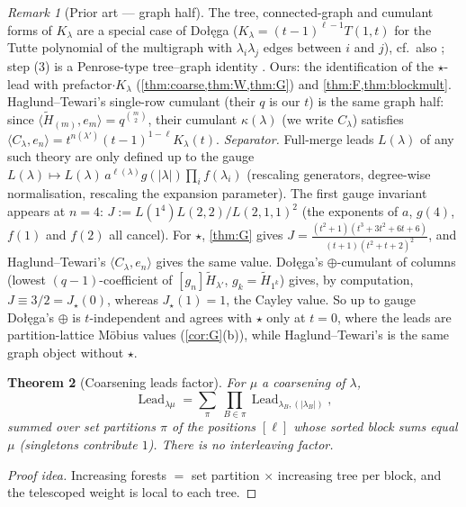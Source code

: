 \documentclass[submission]{FPSAC2027}
\newtheorem{theorem}{Theorem}[section]
\theoremstyle{definition}
\theoremstyle{remark}
\newtheorem{remark}[theorem]{Remark}
\newcommand{\Lead}{\operatorname{Lead}}
\begin{document}
\begin{remark}[Prior art --- graph half]
The tree, connected-graph and cumulant forms of $K_\lambda$ are a special case of Do{\l}{\k{e}}ga \cite[Prop.~2.1 and (11), Lemma~2.3]{Dolega19} ($K_\lambda=(t-1)^{\ell-1}T(1,t)$ for the Tutte polynomial of the multigraph with $\lambda_i\lambda_j$ edges between $i$ and $j$), cf.\ also \cite{GesselSagan96,MallowsRiordan68}; step (3) is a Penrose-type tree--graph identity \cite{Penrose67}. Ours: the identification of the $\star$-lead with prefactor$\cdot K_\lambda$ (\cref{thm:coarse,thm:W,thm:G}) and \cref{thm:F,thm:blockmult}. Haglund--Tewari's single-row cumulant \cite[Def.~7.1, Thm.~7.3]{HaglundTewari26} (their $q$ is our $t$) is the same graph half: since $\langle\widetilde H_{(m)},e_m\rangle=q^{\binom m2}$, their cumulant $\kappa(\lambda)$ (we write $C_\lambda$) satisfies $\langle C_\lambda,e_n\rangle=t^{n(\lambda')}(t-1)^{1-\ell}K_\lambda(t)$.
\emph{Separator.} Full-merge leads $L(\lambda)$ of any such theory are only defined up to the gauge $L(\lambda)\mapsto L(\lambda)\,a^{\ell(\lambda)}g(|\lambda|)\prod_if(\lambda_i)$ (rescaling generators, degree-wise normalisation, rescaling the expansion parameter). The first gauge invariant appears at $n=4$: $J:=L(1^4)L(2,2)/L(2,1,1)^2$ (the exponents of $a$, $g(4)$, $f(1)$ and $f(2)$ all cancel). For $\star$, \cref{thm:G} gives $J=\frac{(t^2+1)(t^3+3t^2+6t+6)}{(t+1)(t^2+t+2)^2}$, and Haglund--Tewari's $\langle C_\lambda,e_n\rangle$ gives the same value. Do{\l}{\k{e}}ga's $\oplus$-cumulant of columns (lowest $(q-1)$-coefficient of $[g_n]\widetilde H_{\lambda'}$, $g_k=\widetilde H_{1^k}$) gives, by computation, $J\equiv 3/2=J_\star(0)$, whereas $J_\star(1)=1$, the Cayley value. So up to gauge Do{\l}{\k{e}}ga's $\oplus$ is $t$-independent and agrees with $\star$ only at $t=0$, where the leads are partition-lattice M\"obius values (\cref{cor:G}(b)), while Haglund--Tewari's is the same graph object without $\star$.
\end{remark}

\begin{theorem}[Coarsening leads factor]\label{thm:F}
For $\mu$ a coarsening of $\lambda$,
\[ \Lead_{\lambda\mu}=\sum_{\pi}\ \prod_{B\in\pi}\Lead_{\lambda_B,(|\lambda_B|)}, \]
summed over set partitions $\pi$ of the positions $[\ell]$ whose sorted block sums equal $\mu$ (singletons contribute $1$). There is no interleaving factor.
\end{theorem}
\begin{proof}[Proof idea]
Increasing forests $=$ set partition $\times$ increasing tree per block, and the telescoped weight is local to each tree.
\end{proof}
\end{document}
